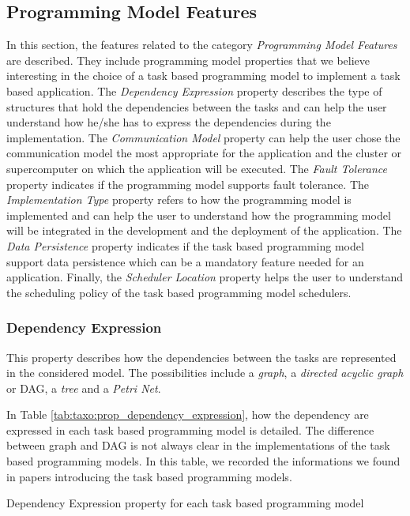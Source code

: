 \subsection{Programming Model Features}
In this section, the features related to the category \textit{Programming Model Features} are described.
They include programming model properties that we believe interesting in the choice of a task based programming model to implement a task based application.
The \textit{Dependency Expression} property describes the type of structures that hold the dependencies between the tasks and can help the user understand how he/she has to express the dependencies during the implementation.
The \textit{Communication Model} property can help the user chose the communication model the most appropriate for the application and the cluster or supercomputer on which the application will be executed.
The \textit{Fault Tolerance} property indicates if the programming model supports fault tolerance.
The \textit{Implementation Type} property refers to how the programming model is implemented and can help the user to understand how the programming model will be integrated in the development and the deployment of the application.
The \textit{Data Persistence} property indicates if the task based programming model support data persistence which can be a mandatory feature needed for an application.
Finally, the \textit{Scheduler Location} property helps the user to understand the scheduling policy of the task based programming model schedulers.

\subsubsection{Dependency Expression}
This property describes how the dependencies between the tasks are represented in the considered model.
The possibilities include a \textit{graph}, a \textit{directed acyclic graph} or DAG, a \textit{tree} and a \textit{Petri Net}.

In Table \ref{tab:taxo:prop_dependency_expression}, how the dependency are expressed in each task based programming model is detailed.
The difference between graph and DAG is not always clear in the implementations of the task based programming models.
In this table, we recorded the informations we found in papers introducing the task based programming models.

\begin{table}[H]
	\caption{Dependency Expression property for each task based programming model \label{tab:taxo:prop_dependency_expression}}
	\centering
	\begin{multicols}{2}
		

		
	\end{multicols}
\end{table}


